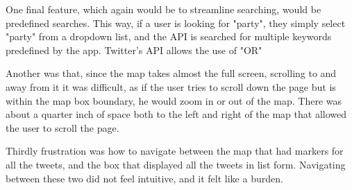 \documentclass[11pt]{article}
\begin{document}
One final feature, which again would be to streamline searching, would be predefined searches. This way, if a user is looking for "party", they simply select "party" from a dropdown list, and the API is searched for multiple keywords predefined by the app. Twitter's API allows the use of "OR"






Another was that, since the map takes almost the full screen, scrolling to and away from it it was difficult, as if the user tries to scroll down the page but is within the map box boundary, he would zoom in or out of the map. There was about a quarter inch of space both to the left and right of the map that allowed the user to scroll the page. 



Thirdly frustration was how to navigate between the map that had markers for all the tweets, and the box that displayed all the tweets in list form. Navigating between these two did not feel intuitive, and it felt like a burden.




\end{document}
